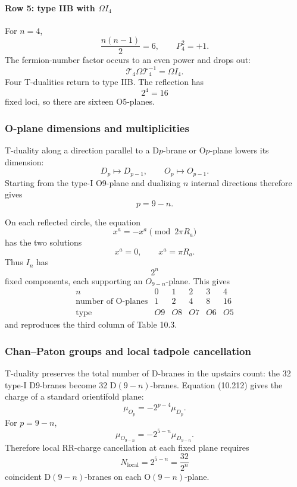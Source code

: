 \documentclass[
  10pt,
  a4paper,
  openany]{book}
\begin{document}
\paragraph{\texorpdfstring{Row 5: type IIB with
\(\Omega I_4\)}{Row 5: type IIB with \textbackslash Omega I\_4}}\label{row-5-type-iib-with-omega-i_4}

For \(n=4\), \[
\frac{n(n-1)}2=6,
\qquad
P_4^2=+1.
\] The fermion-number factor occurs to an even power and drops out: \[
\boxed{
\mathcal T_4\Omega\mathcal T_4^{-1}
=
\Omega I_4
}.
\] Four T-dualities return to type IIB. The reflection has \[
2^4=16
\] fixed loci, so there are sixteen O5-planes.

\subsubsection{O-plane dimensions and
multiplicities}\label{o-plane-dimensions-and-multiplicities}

T-duality along a direction parallel to a D\(p\)-brane or O\(p\)-plane
lowers its dimension: \[
D_p\longmapsto D_{p-1},
\qquad
O_p\longmapsto O_{p-1}.
\] Starting from the type-I O9-plane and dualizing \(n\) internal
directions therefore gives \[
p=9-n.
\]

On each reflected circle, the equation \[
x^a=-x^a\pmod{2\pi R_a}
\] has the two solutions \[
x^a=0,
\qquad
x^a=\pi R_a.
\] Thus \(I_n\) has \[
\boxed{
2^n
}
\] fixed components, each supporting an \(O_{9-n}\)-plane. This gives \[
\begin{array}{c|ccccc}
n&0&1&2&3&4\\ \hline
\text{number of O-planes}&1&2&4&8&16\\
\text{type}&O9&O8&O7&O6&O5
\end{array}
\] and reproduces the third column of Table 10.3.

\subsubsection{Chan--Paton groups and local tadpole
cancellation}\label{chanpaton-groups-and-local-tadpole-cancellation}

T-duality preserves the total number of D-branes in the upstairs count:
the 32 type-I D9-branes become 32 D\((9-n)\)-branes. Equation (10.212)
gives the charge of a standard orientifold plane: \[
\mu_{O_p}
=
-2^{p-4}\mu_{D_p}.
\] For \(p=9-n\), \[
\mu_{O_{9-n}}
=
-2^{5-n}\mu_{D_{9-n}}.
\] Therefore local RR-charge cancellation at each fixed plane requires
\[
\boxed{
N_{\mathrm{local}}
=
2^{5-n}
=
\frac{32}{2^n}
}
\] coincident D\((9-n)\)-branes on each O\((9-n)\)-plane.
\end{document}
